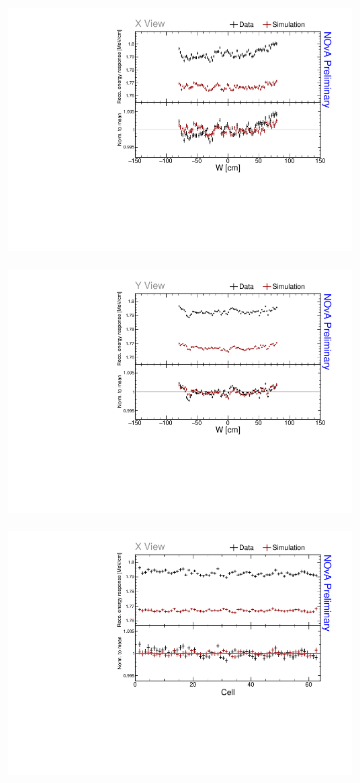 \begin{figure}[!ht]
  \begin{subfigure}{0.495\textwidth}
    \includegraphics[width=\linewidth]{Plots/PCListAna/DataAndSim_recomevcm_ts_w_X.pdf}
  \end{subfigure}
  \begin{subfigure}{0.495\textwidth}
    \includegraphics[width=\linewidth]{Plots/PCListAna/DataAndSim_recomevcm_ts_w_y.pdf}
  \end{subfigure}
  \begin{subfigure}{0.495\textwidth}
    \includegraphics[width=\linewidth]{Plots/PCListAna/DataAndSim_recomevcm_ts_cell_x.pdf}

\end{subfigure}
\end{figure}
